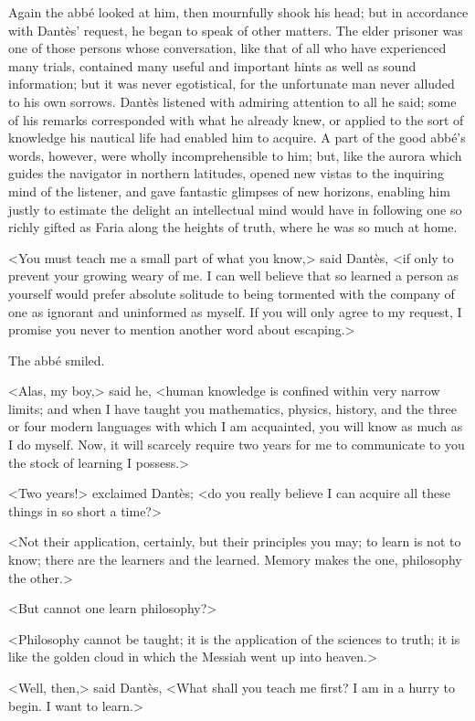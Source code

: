  Again the abbé looked at him, then mournfully shook his head; but in accordance with Dantès' request, he began to speak of other matters. The elder prisoner was one of those persons whose conversation, like that of all who have experienced many trials, contained many useful and important hints as well as sound information; but it was never egotistical, for the unfortunate man never alluded to his own sorrows. Dantès listened with admiring attention to all he said; some of his remarks corresponded with what he already knew, or applied to the sort of knowledge his nautical life had enabled him to acquire. A part of the good abbé's words, however, were wholly incomprehensible to him; but, like the aurora which guides the navigator in northern latitudes, opened new vistas to the inquiring mind of the listener, and gave fantastic glimpses of new horizons, enabling him justly to estimate the delight an intellectual mind would have in following one so richly gifted as Faria along the heights of truth, where he was so much at home. 

 <You must teach me a small part of what you know,> said Dantès, <if only to prevent your growing weary of me. I can well believe that so learned a person as yourself would prefer absolute solitude to being tormented with the company of one as ignorant and uninformed as myself. If you will only agree to my request, I promise you never to mention another word about escaping.> 

 The abbé smiled. 

 <Alas, my boy,> said he, <human knowledge is confined within very narrow limits; and when I have taught you mathematics, physics, history, and the three or four modern languages with which I am acquainted, you will know as much as I do myself. Now, it will scarcely require two years for me to communicate to you the stock of learning I possess.> 

 <Two years!> exclaimed Dantès; <do you really believe I can acquire all these things in so short a time?> 

 <Not their application, certainly, but their principles you may; to learn is not to know; there are the learners and the learned. Memory makes the one, philosophy the other.> 

 <But cannot one learn philosophy?> 

 <Philosophy cannot be taught; it is the application of the sciences to truth; it is like the golden cloud in which the Messiah went up into heaven.> 

 <Well, then,> said Dantès, <What shall you teach me first? I am in a hurry to begin. I want to learn.> 

